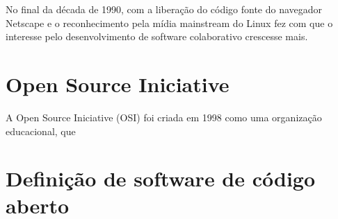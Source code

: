 \documentclass[12pt, a4paper]{report}
\begin{document}
No final da década de 1990, com a liberação do código fonte do navegador Netscape e o reconhecimento pela mídia mainstream do Linux fez com que o interesse pelo desenvolvimento de software colaborativo crescesse mais.

\section{Open Source Iniciative}

A Open Source Iniciative (OSI) foi criada em 1998 como uma organização educacional, que 

\section{Definição de software de código aberto}
\end{document}
